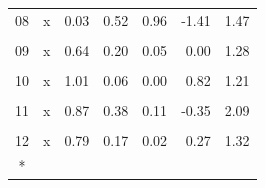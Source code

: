 \begin{longtable}[t]{ccrrrrr}
08 & x & 0.03 & 0.52 & 0.96 & -1.41 & 1.47\\
\cellcolor{gray!10}{09} & \cellcolor{gray!10}{(Intercept)} & \cellcolor{gray!10}{-5679.39} & \cellcolor{gray!10}{20080.84} & \cellcolor{gray!10}{0.80} & \cellcolor{gray!10}{-69585.58} & \cellcolor{gray!10}{58226.80}\\
09 & x & 0.64 & 0.20 & 0.05 & 0.00 & 1.28\\
\cellcolor{gray!10}{10} & \cellcolor{gray!10}{(Intercept)} & \cellcolor{gray!10}{-15329.75} & \cellcolor{gray!10}{3389.02} & \cellcolor{gray!10}{0.02} & \cellcolor{gray!10}{-26115.12} & \cellcolor{gray!10}{-4544.38}\\
10 & x & 1.01 & 0.06 & 0.00 & 0.82 & 1.21\\
\cellcolor{gray!10}{11} & \cellcolor{gray!10}{(Intercept)} & \cellcolor{gray!10}{-7362.08} & \cellcolor{gray!10}{14110.85} & \cellcolor{gray!10}{0.64} & \cellcolor{gray!10}{-52269.10} & \cellcolor{gray!10}{37544.93}\\
11 & x & 0.87 & 0.38 & 0.11 & -0.35 & 2.09\\
\cellcolor{gray!10}{12} & \cellcolor{gray!10}{(Intercept)} & \cellcolor{gray!10}{-4133.56} & \cellcolor{gray!10}{3374.23} & \cellcolor{gray!10}{0.31} & \cellcolor{gray!10}{-14871.86} & \cellcolor{gray!10}{6604.74}\\
12 & x & 0.79 & 0.17 & 0.02 & 0.27 & 1.32\\*
\end{longtable}
